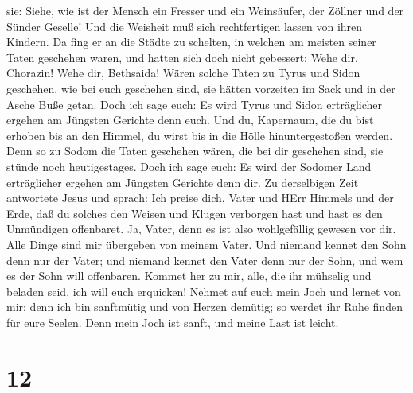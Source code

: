 sie: Siehe, wie ist der Mensch ein Fresser und ein Weinsäufer, der
Zöllner und der Sünder Geselle! Und die Weisheit muß sich rechtfertigen
lassen von ihren Kindern.  Da fing er an die Städte zu
schelten, in welchen am meisten seiner Taten geschehen waren, und hatten
sich doch nicht gebessert:  Wehe dir, Chorazin! Wehe dir,
Bethsaida! Wären solche Taten zu Tyrus und Sidon geschehen, wie bei euch
geschehen sind, sie hätten vorzeiten im Sack und in der Asche Buße
getan.  Doch ich sage euch: Es wird Tyrus und Sidon
erträglicher ergehen am Jüngsten Gerichte denn euch.  Und
du, Kapernaum, die du bist erhoben bis an den Himmel, du wirst bis in
die Hölle hinuntergestoßen werden. Denn so zu Sodom die Taten geschehen
wären, die bei dir geschehen sind, sie stünde noch heutigestages.
 Doch ich sage euch: Es wird der Sodomer Land erträglicher
ergehen am Jüngsten Gerichte denn dir.  Zu derselbigen Zeit
antwortete Jesus und sprach: Ich preise dich, Vater und HErr Himmels und
der Erde, daß du solches den Weisen und Klugen verborgen hast und hast
es den Unmündigen offenbaret.  Ja, Vater, denn es ist also
wohlgefällig gewesen vor dir.  Alle Dinge sind mir
übergeben von meinem Vater. Und niemand kennet den Sohn denn nur der
Vater; und niemand kennet den Vater denn nur der Sohn, und wem es der
Sohn will offenbaren.  Kommet her zu mir, alle, die ihr
mühselig und beladen seid, ich will euch erquicken!  Nehmet
auf euch mein Joch und lernet von mir; denn ich bin sanftmütig und von
Herzen demütig; so werdet ihr Ruhe finden für eure Seelen. 
Denn mein Joch ist sanft, und meine Last ist leicht.

\hypertarget{section-11}{%
\section{12}\label{section-11}}

